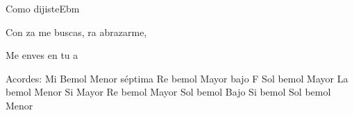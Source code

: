\documentclass[12pt, spanish]{book}
\begin{document}
\begin{song}{Como dijiste}{Ebm}
\begin{SBOpGroup}
            Con za me buscas, ra abrazarme,

            Me enves en tu a
        \end{SBOpGroup}

        \ifChordBk
        \begin{SBOpGroup}
            Acordes:\break
            \upchord{\Eflatmseven}Mi Bemol Menor s\'eptima  \hfill
            \upchord{\DflatF}\qquad Re bemol Mayor bajo F  \hfill\null\break
            \upchord{\Gflat}\qquad Sol bemol Mayor \hfill
            \upchord{\Aflatm}\qquad La bemol Menor \hfill\null\break
            \upchord{\B}\qquad\qquad Si Mayor \hfill
            \upchord{\Dflat}\qquad Re bemol Mayor  \hfill\null\break
            \upchord{\GflatBflat}Sol bemol Bajo Si bemol \hfill
            \upchord{\Gflatm}\qquad Sol bemol Menor \hfill\null\break
        \end{SBOpGroup}
        \fi
    \end{song}
\end{document}
